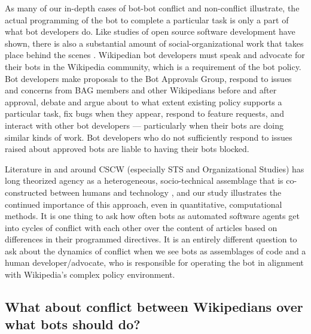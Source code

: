 \documentclass[format=acmsmall, review=false, screen=true]{acmart}%
\begin{document}
As many of our in-depth cases of bot-bot conflict and non-conflict illustrate, the actual programming of the bot to complete a particular task is only a part of what bot developers do. Like studies of open source software development have shown, there is also a substantial amount of social-organizational work that takes place behind the scenes \cite{Filippova2016,dabbish2013}. Wikipedian bot developers must speak and advocate for their bots in the Wikipedia community, which is a requirement of the bot policy. Bot developers make proposals to the Bot Approvals Group, respond to issues and concerns from BAG members and other Wikipedians before and after approval, debate and argue about to what extent existing policy supports a particular task, fix bugs when they appear, respond to feature requests, and interact with other bot developers --- particularly when their bots are doing similar kinds of work. Bot developers who do not sufficiently respond to issues raised about approved bots are liable to having their bots blocked. 

Literature in and around CSCW (especially STS and Organizational Studies) has long theorized agency as a heterogeneous, socio-technical assemblage that is co-constructed between humans and technology \cite{Orlikowski1992,Bowker1999,Callon1986}, and our study illustrates the continued importance of this approach, even in quantitative, computational methods. It is one thing to ask how often bots as automated software agents get into cycles of conflict with each other over the content of articles based on differences in their programmed directives. It is an entirely different question to ask about the dynamics of conflict when we see bots as assemblages of code and a human developer/advocate, who is responsible for operating the bot in alignment with Wikipedia's complex policy environment.

\subsection{What about conflict between Wikipedians over what bots should do?} \label{s:s}
\end{document}
